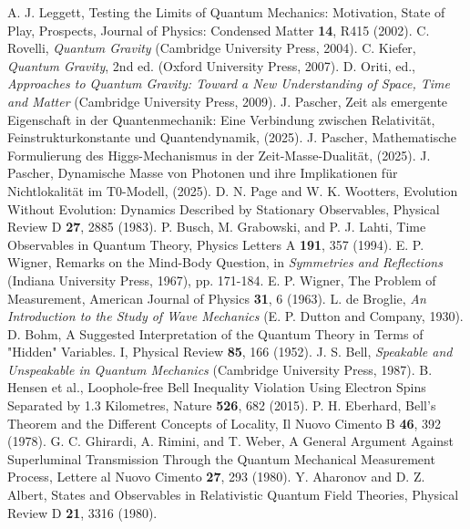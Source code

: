 \documentclass[12pt,a4paper]{article}
\begin{document}
\begin{thebibliography}{99}
		 A. J. Leggett, Testing the Limits of Quantum Mechanics: Motivation, State of Play, Prospects, Journal of Physics: Condensed Matter \textbf{14}, R415 (2002).
		 C. Rovelli, \textit{Quantum Gravity} (Cambridge University Press, 2004).
		 C. Kiefer, \textit{Quantum Gravity}, 2nd ed. (Oxford University Press, 2007).
		 D. Oriti, ed., \textit{Approaches to Quantum Gravity: Toward a New Understanding of Space, Time and Matter} (Cambridge University Press, 2009).
		 J. Pascher, Zeit als emergente Eigenschaft in der Quantenmechanik: Eine Verbindung zwischen Relativität, Feinstrukturkonstante und Quantendynamik, (2025).
		 J. Pascher, Mathematische Formulierung des Higgs-Mechanismus in der Zeit-Masse-Dualität, (2025).
		 J. Pascher, Dynamische Masse von Photonen und ihre Implikationen für Nichtlokalität im T0-Modell, (2025).
		 D. N. Page and W. K. Wootters, Evolution Without Evolution: Dynamics Described by Stationary Observables, Physical Review D \textbf{27}, 2885 (1983).
		 P. Busch, M. Grabowski, and P. J. Lahti, Time Observables in Quantum Theory, Physics Letters A \textbf{191}, 357 (1994).
		 E. P. Wigner, Remarks on the Mind-Body Question, in \textit{Symmetries and Reflections} (Indiana University Press, 1967), pp. 171-184.
		 E. P. Wigner, The Problem of Measurement, American Journal of Physics \textbf{31}, 6 (1963).
		 L. de Broglie, \textit{An Introduction to the Study of Wave Mechanics} (E. P. Dutton and Company, 1930).
		 D. Bohm, A Suggested Interpretation of the Quantum Theory in Terms of "Hidden" Variables. I, Physical Review \textbf{85}, 166 (1952).
		 J. S. Bell, \textit{Speakable and Unspeakable in Quantum Mechanics} (Cambridge University Press, 1987).
		 B. Hensen et al., Loophole-free Bell Inequality Violation Using Electron Spins Separated by 1.3 Kilometres, Nature \textbf{526}, 682 (2015).
		 P. H. Eberhard, Bell's Theorem and the Different Concepts of Locality, Il Nuovo Cimento B \textbf{46}, 392 (1978).
		 G. C. Ghirardi, A. Rimini, and T. Weber, A General Argument Against Superluminal Transmission Through the Quantum Mechanical Measurement Process, Lettere al Nuovo Cimento \textbf{27}, 293 (1980).
		 Y. Aharonov and D. Z. Albert, States and Observables in Relativistic Quantum Field Theories, Physical Review D \textbf{21}, 3316 (1980).

\end{thebibliography}
\end{document}

